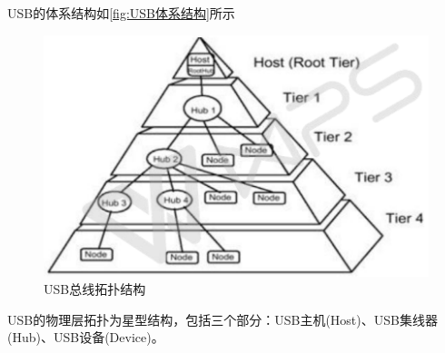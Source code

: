 	USB的体系结构如\autoref{fig:USB体系结构}所示
\begin{figure}[!h]
\centering
\includegraphics[width=1.0\textwidth]{./graphics/usb-structure.pdf}
\caption{USB总线拓扑结构}\label{fig:USB体系结构}
\end{figure}

	USB的物理层拓扑为星型结构，包括三个部分：USB主机(Host)、USB集线器(Hub)、USB设备(Device)。
	
